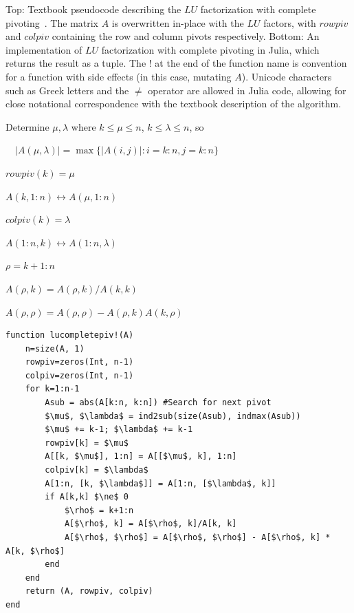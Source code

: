 \begin{algorithm}

\caption{Top: Textbook pseudocode describing the $LU$ factorization with
complete pivoting~\cite[Algorithm 3.4.3 (Outer Product LU with Complete
Pivoting), p. 132]{Golub2013}. The matrix $A$ is overwritten in-place with the
$LU$ factors, with $rowpiv$ and $colpiv$ containing the row and column pivots
respectively.
Bottom: An implementation of $LU$ factorization with complete pivoting in Julia,
which returns the result as a tuple. The ! at the end of the function name is
convention for a function with side effects (in this case, mutating $A$).
Unicode characters such as Greek letters and the $\ne$ operator are allowed in
Julia code, allowing for close notational correspondence with the textbook
description of the algorithm.}
\label{alg:lucompletepiv}

\begin{algorithmic}

    Determine $\mu, \lambda$ where $k \le \mu \le n$,  $k \le \lambda \le n$, so

    $\quad\left|A(\mu, \lambda)\right| = \max\{ \left|A(i, j)\right| : i=k:n, j=k:n \}$

    $rowpiv(k) = \mu$

    $A(k, 1:n) \leftrightarrow A(\mu, 1:n)$

    $colpiv(k) = \lambda$

    $A(1:n, k) \leftrightarrow A(1:n, \lambda)$


        $\rho = k+1:n$

        $A(\rho, k) = A(\rho, k)/A(k, k)$

        $A(\rho, \rho) = A(\rho, \rho) - A(\rho, k) A(k, \rho)$
    \EndIf
\EndFor
\end{algorithmic}

\hrulefill

\begin{lstlisting}
function lucompletepiv!(A)
	n=size(A, 1)
	rowpiv=zeros(Int, n-1)
	colpiv=zeros(Int, n-1)
	for k=1:n-1
		Asub = abs(A[k:n, k:n]) #Search for next pivot
		$\mu$, $\lambda$ = ind2sub(size(Asub), indmax(Asub))
		$\mu$ += k-1; $\lambda$ += k-1
		rowpiv[k] = $\mu$
		A[[k, $\mu$], 1:n] = A[[$\mu$, k], 1:n]
		colpiv[k] = $\lambda$
		A[1:n, [k, $\lambda$]] = A[1:n, [$\lambda$, k]]
		if A[k,k] $\ne$ 0
			$\rho$ = k+1:n
			A[$\rho$, k] = A[$\rho$, k]/A[k, k]
			A[$\rho$, $\rho$] = A[$\rho$, $\rho$] - A[$\rho$, k] * A[k, $\rho$]
		end
	end
	return (A, rowpiv, colpiv)
end
\end{lstlisting}

\end{algorithm}

